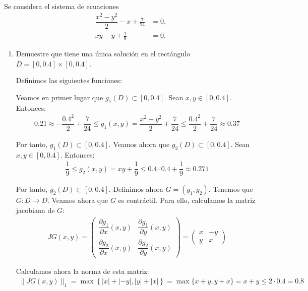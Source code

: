 \begin{ejercicio}\label{ej:1.1.17}
    Se considera el sistema de ecuaciones
    \begin{align*}
        \dfrac{x^2-y^2}{2}-x + \frac{7}{24} &= 0, \\
        xy - y + \frac{1}{9} &= 0.
    \end{align*}
    \begin{enumerate}
        \item Demuestre que tiene una única solución en el rectángulo $D = [0, 0.4] \times [0, 0.4]$.
        
        Definimos las siguientes funciones:

        Veamos en primer lugar que $g_1(D)\subset [0,0.4]$. Sean $x,y\in [0,0.4]$. Entonces:
        \begin{align*}
            0.21\approx -\dfrac{0.4^2}{2}+\dfrac{7}{24}\leq g_1(x,y)=\dfrac{x^2-y^2}{2}+\dfrac{7}{24}\leq \dfrac{0.4^2}{2}+\dfrac{7}{24}\approx 0.37
        \end{align*}

        Por tanto, $g_1(D)\subset [0,0.4]$. Veamos ahora que $g_2(D)\subset [0,0.4]$. Sean $x,y\in [0,0.4]$. Entonces:
        \begin{align*}
            \dfrac{1}{9}\leq g_2(x,y)=xy+\dfrac{1}{9}\leq 0.4\cdot 0.4+\dfrac{1}{9}\approx 0.271
        \end{align*}

        Por tanto, $g_2(D)\subset [0,0.4]$. Definimos ahora $G=(g_1,g_2)$. Tenemos que $G:D\to D$. Veamos ahora que $G$ es contráctil. Para ello, calculamos la matriz jacobiana de $G$:
        \begin{align*}
            JG(x,y)=\begin{pmatrix}
                \dfrac{\partial g_1}{\partial x}(x,y) & \dfrac{\partial g_1}{\partial y}(x,y)\\
                \dfrac{\partial g_2}{\partial x}(x,y) & \dfrac{\partial g_2}{\partial y}(x,y)
            \end{pmatrix}=\begin{pmatrix}
                x & -y\\
                y & x
            \end{pmatrix}
        \end{align*}

        Calculamos ahora la norma de esta matriz:
        \begin{align*}
            \|JG(x,y)\|_1=\max\left\{|x|+|-y|,|y|+|x|\right\}=\max\{x+y,y+x\}=x+y\leq 2\cdot 0.4=0.8
        \end{align*}


\end{enumerate}
\end{ejercicio}
